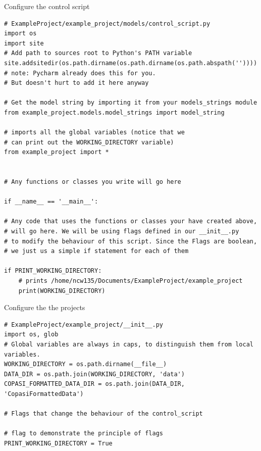 \documentclass[../main]{subfiles}
\begin{document}

\begin{Task}{Configure the control script}
\begin{verbatim}
# ExampleProject/example_project/models/control_script.py
import os
import site
# Add path to sources root to Python's PATH variable
site.addsitedir(os.path.dirname(os.path.dirname(os.path.abspath(''))))
# note: Pycharm already does this for you.
# But doesn't hurt to add it here anyway

# Get the model string by importing it from your models_strings module
from example_project.models.model_strings import model_string

# imports all the global variables (notice that we
# can print out the WORKING_DIRECTORY variable)
from example_project import *


# Any functions or classes you write will go here

if __name__ == '__main__':

# Any code that uses the functions or classes your have created above,
# will go here. We will be using flags defined in our __init__.py
# to modify the behaviour of this script. Since the Flags are boolean,
# we just us a simple if statement for each of them

if PRINT_WORKING_DIRECTORY:
    # prints /home/ncw135/Documents/ExampleProject/example_project
    print(WORKING_DIRECTORY)
\end{verbatim}
\end{Task}

\begin{Task}{Configure the the projects }
\begin{verbatim}
# ExampleProject/example_project/__init__.py
import os, glob
# Global variables are always in caps, to distinguish them from local variables.
WORKING_DIRECTORY = os.path.dirname(__file__)
DATA_DIR = os.path.join(WORKING_DIRECTORY, 'data')
COPASI_FORMATTED_DATA_DIR = os.path.join(DATA_DIR, 'CopasiFormattedData')

# Flags that change the behaviour of the control_script

# flag to demonstrate the principle of flags
PRINT_WORKING_DIRECTORY = True

\end{verbatim}
\end{Task}
\end{document}
